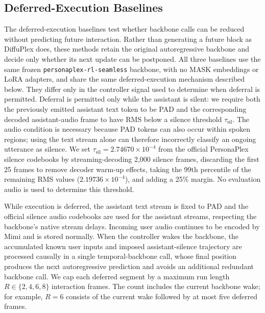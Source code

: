 \subsection{Deferred-Execution Baselines}
\label{asubsec:deferred_baselines}

The deferred-execution baselines test whether backbone calls can be reduced without predicting future interaction.
Rather than generating a future block as DiffuPlex does, these methods retain the original autoregressive backbone and decide only whether its next update can be postponed.
All three baselines use the same frozen \texttt{personaplex-rl-seamless} backbone, with no MASK embeddings or LoRA adapters, and share the same deferred-execution mechanism described below.
They differ only in the controller signal used to determine when deferral is permitted.
Deferral is permitted only while the assistant is silent: we require both the previously emitted assistant text token to be PAD and the corresponding decoded assistant-audio frame to have RMS below a silence threshold $\tau_{\mathrm{sil}}$.
The audio condition is necessary because PAD tokens can also occur within spoken regions; using the text stream alone can therefore incorrectly classify an ongoing utterance as silence.
We set $\tau_{\mathrm{sil}}=2.74670\times10^{-4}$ from the official PersonaPlex silence codebooks by streaming-decoding 2,000 silence frames, discarding the first 25 frames to remove decoder warm-up effects, taking the 99th percentile of the remaining RMS values ($2.19736\times10^{-4}$), and adding a 25\% margin.
No evaluation audio is used to determine this threshold.

While execution is deferred, the assistant text stream is fixed to PAD and the official silence audio codebooks are used for the assistant streams, respecting the backbone's native stream delays.
Incoming user audio continues to be encoded by Mimi and is stored normally.
When the controller wakes the backbone, the accumulated known user inputs and imposed assistant-silence trajectory are processed causally in a single temporal-backbone call, whose final position produces the next autoregressive prediction and avoids an additional redundant backbone call.
We cap each deferred segment by a maximum run length $R\in\{2,4,6,8\}$ interaction frames.
The count includes the current backbone wake; for example, $R=6$ consists of the current wake followed by at most five deferred frames.

